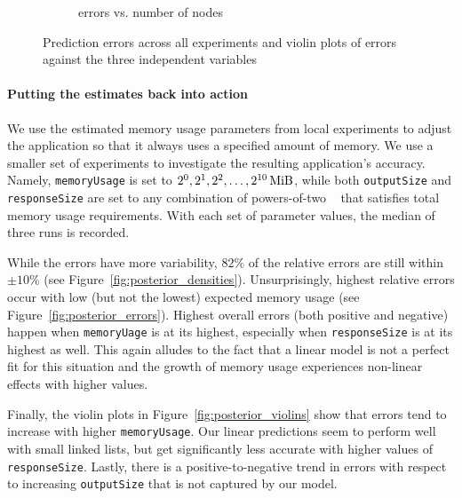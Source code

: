 \documentclass{article}
\begin{document}
\begin{figure}
\begin{subfigure}[t]{0.49\textwidth}
    \caption{errors vs. number of nodes}
  \end{subfigure}
  \caption{Prediction errors across all experiments and violin plots of errors
    against the three independent variables}
  \label{fig:predictions}
\end{figure}

\paragraph{Putting the estimates back into action}

We use the estimated memory usage parameters from local experiments to adjust
the application so that it always uses a specified amount of memory. We use a
smaller set of experiments to investigate the resulting application's accuracy.
Namely, \texttt{memoryUsage} is set to $2^0, 2^1, 2^2, \dots,
\SI[exponent-base = 2]{e10}{\mebi\byte}$, while both \texttt{outputSize} and
\texttt{responseSize} are set to any combination of powers-of-two
\si{\mebi\byte} that satisfies total memory usage requirements. With each set of
parameter values, the median of three runs is recorded.

While the errors have more variability, $82\%$ of the relative errors are still
within $\pm10\%$ (see Figure~\ref{fig:posterior_densities}). Unsurprisingly,
highest relative errors occur with low (but not the lowest) expected memory
usage (see Figure~\ref{fig:posterior_errors}). Highest overall errors (both
positive and negative) happen when \texttt{memoryUage} is at its highest,
especially when \texttt{responseSize} is at its highest as well. This again
alludes to the fact that a linear model is not a perfect fit for this situation
and the growth of memory usage experiences non-linear effects with higher
values.

Finally, the violin plots in Figure~\ref{fig:posterior_violins} show that errors
tend to increase with higher \texttt{memoryUsage}. Our linear predictions seem
to perform well with small linked lists, but get significantly less accurate
with higher values of \texttt{responseSize}. Lastly, there is a
positive-to-negative trend in errors with respect to increasing
\texttt{outputSize} that is not captured by our model.
\end{document}
